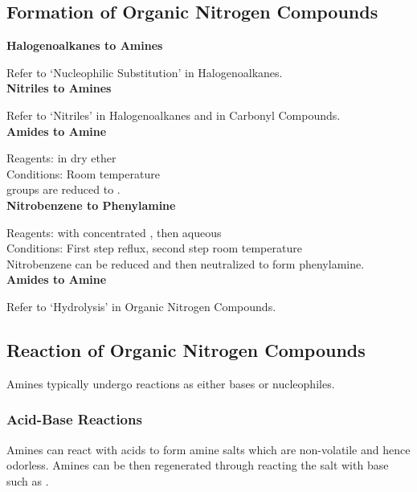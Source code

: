 \documentclass[../main]{subfiles}
\begin{document}
	\subsection{Formation of Organic Nitrogen Compounds}

	\noindent \textbf{Halogenoalkanes to Amines}

	Refer to `Nucleophilic Substitution' in Halogenoalkanes. \\

	\noindent \textbf{Nitriles to Amines}

	Refer to `Nitriles' in Halogenoalkanes and in Carbonyl Compounds. \\

	\noindent \textbf{Amides to Amine}

	Reagents:  in dry ether \\
	Conditions: Room temperature \\

	 groups are reduced to . \\

	\noindent \textbf{Nitrobenzene to Phenylamine}

	Reagents:  with concentrated , then aqueous  \\
	Conditions: First step reflux, second step room temperature \\

	Nitrobenzene can be reduced and then neutralized to form phenylamine. \\

	\noindent \textbf{Amides to Amine}

	Refer to `Hydrolysis' in Organic Nitrogen Compounds. \\

	\subsection{Reaction of Organic Nitrogen Compounds}

	Amines typically undergo reactions as either bases or nucleophiles. \\

	\subsubsection{Acid-Base Reactions}

	Amines can react with acids to form amine salts which are non-volatile and hence odorless. Amines can be then regenerated through reacting the salt with base such as . \\
\end{document}

